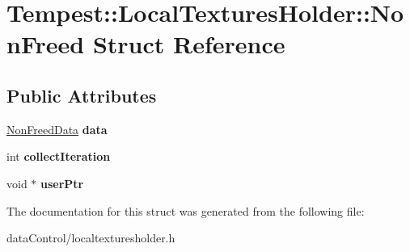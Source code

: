\hypertarget{struct_tempest_1_1_local_textures_holder_1_1_non_freed}{\section{Tempest\+:\+:Local\+Textures\+Holder\+:\+:Non\+Freed Struct Reference}
\label{struct_tempest_1_1_local_textures_holder_1_1_non_freed}
}
\subsection*{Public Attributes}
\begin{DoxyCompactItemize}
\item 
\hypertarget{struct_tempest_1_1_local_textures_holder_1_1_non_freed_a27ac0857b03fd788263f912fafbfebe3}{\hyperlink{struct_tempest_1_1_local_textures_holder_1_1_non_freed_data}{Non\+Freed\+Data} {\bfseries data}}\label{struct_tempest_1_1_local_textures_holder_1_1_non_freed_a27ac0857b03fd788263f912fafbfebe3}

\item 
\hypertarget{struct_tempest_1_1_local_textures_holder_1_1_non_freed_ac4ff2bd68300b1798d94561319b39b8f}{int {\bfseries collect\+Iteration}}\label{struct_tempest_1_1_local_textures_holder_1_1_non_freed_ac4ff2bd68300b1798d94561319b39b8f}

\item 
\hypertarget{struct_tempest_1_1_local_textures_holder_1_1_non_freed_acbb90184c467fc441c6f25886d0fa859}{void $\ast$ {\bfseries user\+Ptr}}\label{struct_tempest_1_1_local_textures_holder_1_1_non_freed_acbb90184c467fc441c6f25886d0fa859}

\end{DoxyCompactItemize}


The documentation for this struct was generated from the following file\+:\begin{DoxyCompactItemize}
\item 
data\+Control/localtexturesholder.\+h\end{DoxyCompactItemize}
